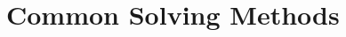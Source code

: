 \documentclass[../mmf.tex]{subfiles}
\begin{document}
\section{Common Solving Methods}
\end{document}
